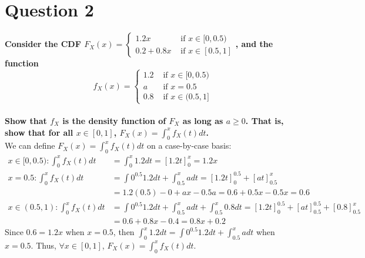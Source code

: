 \documentclass{article}
\begin{document}
\section*{Question 2}
\textbf{Consider the CDF $F_X(x)=\begin{cases}1.2x&\text{   if } x\in[0,0.5) \\ 0.2+0.8x&\text{   if } x\in[0.5,1] \end{cases}$, and the function}
\[
	f_X(x)=\begin{cases}1.2&\text{   if } x\in[0,0.5) \\ a&\text{   if } x=0.5 \\ 0.8&\text{   if } x\in(0.5,1]\end{cases}
\]
\smallskip \\
\textbf{Show that $f_X$ is the density function of $F_X$ as long as $a\geq0$. That is, show that for all $x\in[0,1]$, $F_X(x)=\int_0^x f_X(t)dt$.}
\bigskip \\
We can define $F_X(x)=\int_0^x f_X(t)dt$ on a case-by-case basis:
\begin{align*}
	x\in[0,0.5): 	\int_0^x f_X(t)dt	&=\int_0^x 1.2dt = [1.2t]_0^x = 1.2x																\\
	x=0.5:			\int_0^x f_X(t)dt	&=\int0^0.5 1.2dt + \int_0.5^x a dt = [1.2t]^0.5_0 + [at]^x_0.5 									\\
										&= 1.2(0.5) - 0 + ax - 0.5a	=0.6 + 0.5x - 0.5x = 0.6												\\
	x\in(0.5,1):	\int_0^x f_X(t)dt	&=\int0^0.5 1.2dt + \int_0.5^x a dt + \int_0.5^x 0.8dt = [1.2t]^0.5_0 + [at]^0.5_0.5 +[0.8]^x_0.5	\\
										&= 0.6 + 0.8x - 0.4 = 0.8x + 0.2
\end{align*}
Since $0.6=1.2x$ when $x=0.5$, then $\int_0^x 1.2dt=\int0^0.5 1.2dt + \int_0.5^x a dt$ when $x=0.5$. Thus,  $\forall x\in[0,1]$, $F_X(x)=\int_0^x f_X(t)dt$.


\end{document}
